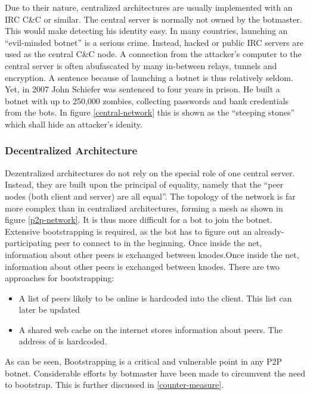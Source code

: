 \documentclass{llncs}
\begin{document}
Due to their nature, centralized architectures are usually implemented
with an IRC C\&C or similar\cite{cooke2005zombie}. The central server
is normally not owned by the botmaster. This would make detecting his
identity easy. In many countries, launching an ``evil-minded botnet''
is a serious crime. Instead, hacked or public IRC servers are used as
the central C\&C node. A connection from the attacker's computer to
the central server is often abufascated by many in-between relays,
tunnels and encryption. A sentence because of launching a botnet is
thus relatively seldom. Yet, in 2007 John Schiefer was sentenced to
four years in prison. He built a botnet with up to 250,000 zombies,
collecting passwords and bank credentials from the bots.  In figure
\ref{central-network} this is shown as the ``steeping stones'' which
shall hide an attacker's idenity.

\subsubsection{Decentralized Architecture}
\label{decent}
Dezentralized architectures do not rely on the special role of one
central server. Instead, they are built upon the principal of
equality, namely that the ``peer nodes (both client and server) are
all equal''\cite{steggink2007detection}. The topology of the network
is far more complex than in centralized architectures, forming a mesh
as shown in figure \ref{p2p-network}. It is thus more difficult for a
bot to join the botnet. Extensive bootstrapping is required, as the
bot has to figure out an already-participating peer to connect to in the
beginning. Once inside the net, information about other peers is
exchanged between knodes.Once inside the net, information about other peers is
exchanged between knodes. There are two approaches for bootstrapping\cite{wang2009systematic}:
\begin{itemize}
\item A list of peers likely to be online is hardcoded into the client. This list can later be updated
\item A shared web cache on the internet stores information about
  peers. The address of is hardcoded.
\end{itemize}

As can be seen, Bootstrapping is a critical and vulnerable point in
any P2P botnet. Considerable efforts by botmaster have been made to
circumvent the need to bootstrap\cite{td1sc}. This is further
discussed in \ref{counter-measure}.
\end{document}
